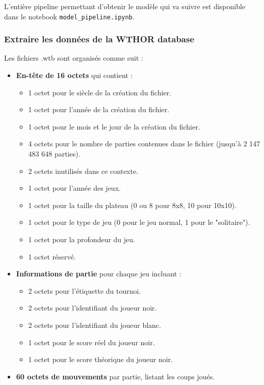 L'entière pipeline permettant d'obtenir le modèle qui va suivre est disponible dans le notebook \texttt{model\_pipeline.ipynb}.

\subsubsection{Extraire les données de la WTHOR database}
\label{subsubsec:wthor}
Les fichiers .wtb sont organisés comme suit :
\begin{itemize}
    \item \textbf{En-tête de 16 octets} qui contient :
    \begin{itemize}
        \item 1 octet pour le siècle de la création du fichier.
        \item 1 octet pour l'année de la création du fichier.
        \item 1 octet pour le mois et le jour de la création du fichier.
        \item 4 octets pour le nombre de parties contenues dans le fichier (jusqu'à 2 147 483 648 parties).
        \item 2 octets inutilisés dans ce contexte.
        \item 1 octet pour l'année des jeux.
        \item 1 octet pour la taille du plateau (0 ou 8 pour 8x8, 10 pour 10x10).
        \item 1 octet pour le type de jeu (0 pour le jeu normal, 1 pour le "solitaire").
        \item 1 octet pour la profondeur du jeu.
        \item 1 octet réservé.
    \end{itemize}
    \item \textbf{Informations de partie} pour chaque jeu incluant :
    \begin{itemize}
        \item 2 octets pour l'étiquette du tournoi.
        \item 2 octets pour l'identifiant du joueur noir.
        \item 2 octets pour l'identifiant du joueur blanc.
        \item 1 octet pour le score réel du joueur noir.
        \item 1 octet pour le score théorique du joueur noir.
    \end{itemize}
    \item \textbf{60 octets de mouvements} par partie, listant les coups joués.
\end{itemize}

